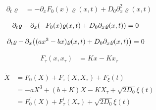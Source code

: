 \documentclass[a4paper,10pt]{article}
\begin{document}
\begin{align}
	\partial_t
	\varrho
	&=
	-
	\partial_x
	F_0(x)
	\varrho(x,t)
	+
	D_0
	\partial_x^2
	\varrho(x,t)
\end{align}

\begin{align}
	\partial_t
	\varrho
	-
	\partial_x
	\pqty{
		-
		F_0(x)
		\varrho(x,t)
		+
		D_0
		\partial_x
		\varrho(x,t)
	}
	&=
	0
\end{align}

\begin{align}
	\partial_t
	\varrho
	-
	\partial_x
	\pqty{
		(ax^3-bx)
		\varrho(x,t)
		+
		D_0
		\partial_x
		\varrho(x,t)
	}
	&=
	0
\end{align}

\begin{align}
	F_\tau
	(x,x_\tau)
	&=
	Kx
	-
	Kx_\tau
\end{align}

\begin{align}
	\dot{X}
	&=
	F_0(X)
	+
	F_\tau(X,X_\tau)
	+
	F_\xi(t)
	\\
	&=
	-aX^3
	+
	(b+K)
	X
	-
	KX_\tau
	+
	\sqrt{2D_0}
	\xi(t)
\\
	&=
	F_0^\prime(X)
	+
	F_\tau^\prime(X_\tau)
	+
	\sqrt{2D_0}
	\xi(t)
\end{align}
\end{document}
